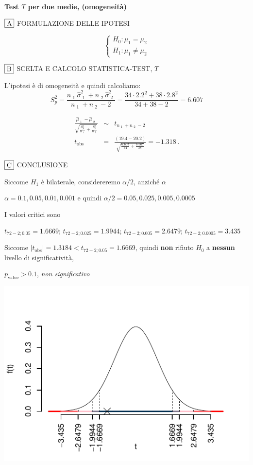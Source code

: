 \documentclass[
  11pt,
]{book}
\theoremstyle{mytheoremstyle}
\theoremstyle{mydefstyle}
\newenvironment{sol}
  {
  \begin{tcolorbox}[enhanced,breakable,arc=0.1mm,boxrule=1pt,colback=white,colframe=iblue,
  title=\bf \fontfamily{lmss}\selectfont \hspace{.5 cm} Soluzione,drop fuzzy shadow]

}{
\end{tcolorbox}
  }
\begin{document}
\begin{sol}
\textbf{Test \(T\) per due medie, (omogeneità)}

\(\fbox{A}\) FORMULAZIONE DELLE IPOTESI

\[\begin{cases}
   H_0: \mu_\text{1} = \mu_\text{2} \\
   H_1: \mu_\text{1} \neq \mu_\text{2} 
   \end{cases}\]

\(\fbox{B}\) SCELTA E CALCOLO STATISTICA-TEST, \(T\)

L'ipotesi è di omogeneità e quindi calcoliamo:\[
   S_p^2=\frac{n_\text{ 1 }\hat\sigma^2_\text{ 1 }+n_\text{ 2 }\hat\sigma^2_\text{ 2 }}{n_\text{ 1 }+n_\text{ 2 }-2} =
   \frac{ 34 \cdot 2.2 ^2+ 38 \cdot 2.8 ^2}{ 34 + 38 -2}= 6.607 
  \]

\begin{eqnarray*}
  \frac{\hat\mu_\text{ 1 } - \hat\mu_\text{ 2 }}
  {\sqrt{\frac {S^2_p}{n_\text{ 1 }}+\frac {S^2_p}{n_\text{ 2 }}}}&\sim&t_{n_\text{ 1 }+n_\text{ 2 }-2}\\
  t_{\text{obs}}
  &=& \frac{ ( 19.4 -  20.2 )} {\sqrt{\frac{ 6.607 }{ 34 }+\frac{ 6.607 }{ 38 }}}
  =   -1.318 \, .
  \end{eqnarray*}

\(\fbox{C}\) CONCLUSIONE

Siccome \(H_1\) è bilaterale, considereremo \(\alpha/2\),
anziché \(\alpha\)

\(\alpha=0.1, 0.05, 0.01, 0.001\) e quindi \(\alpha/2=0.05, 0.025, 0.005, 0.0005\)

I valori critici sono

\(t_{72-2;0.05}=1.6669\); \(t_{72-2;0.025}=1.9944\); \(t_{72-2;0.005}=2.6479\); \(t_{72-2;0.0005}=3.435\)

Siccome \(|t_\text{obs}|=1.3184<t_{72-2;0.05}=1.6669\), quindi \textbf{non} rifiuto \(H_0\) a \textbf{nessun} livello di significatività,

\(p_\text{value}>0.1\), \emph{non significativo}

\begin{center}\includegraphics{Esami_passati_con_soluzioni_files/figure-latex/2022-47-1} \end{center}


\end{sol}
\end{document}
